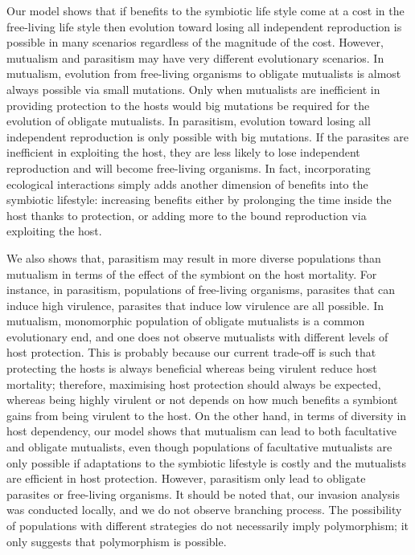 \documentclass[11.5pt]{article}
\begin{document}
\medskip

Our model shows that if benefits to the symbiotic life style come at a cost in the free-living life style then evolution toward losing all independent reproduction is possible in many scenarios regardless of the magnitude of the cost. However, mutualism and parasitism may have very different evolutionary scenarios. In mutualism, evolution from free-living organisms to obligate mutualists is almost always possible via small mutations. Only when mutualists are inefficient in providing protection to the hosts would big mutations be required for the evolution of obligate mutualists. In parasitism, evolution toward losing all independent reproduction is only possible with big mutations. If the parasites are inefficient in exploiting the host, they are less likely to lose independent reproduction and will become free-living organisms. In fact, incorporating ecological interactions simply adds another dimension of benefits into the symbiotic lifestyle: increasing benefits either by prolonging the time inside the host thanks to protection, or adding more to the bound reproduction via exploiting the host. 

\medskip

We also shows that, parasitism may result in more diverse populations than mutualism in terms of the effect of the symbiont on the host mortality. For instance, in parasitism, populations of free-living organisms, parasites that can induce high virulence, parasites that induce low virulence are all possible. In mutualism, monomorphic population of obligate mutualists is a common evolutionary end, and one does not observe mutualists with different levels of host protection. This is probably because our current trade-off is such that protecting the hosts is always beneficial whereas being virulent reduce host mortality; therefore, maximising host protection should always be expected, whereas being highly virulent or not depends on how much benefits a symbiont gains from being virulent to the host. On the other hand, in terms of diversity in host dependency, our model shows that mutualism can lead to both facultative and obligate mutualists, even though populations of facultative mutualists are only possible if adaptations to the symbiotic lifestyle is costly and the mutualists are efficient in host protection. However, parasitism only lead to obligate parasites or free-living organisms. It should be noted that, our invasion analysis was conducted locally, and we do not observe branching process. The possibility of populations with different strategies do not necessarily imply polymorphism; it only suggests that polymorphism is possible.
\end{document}
